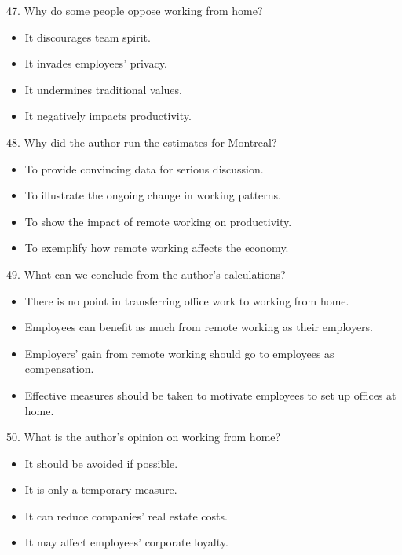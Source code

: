 \documentclass[UTF8,11pt]{ctexart}
\begin{document}
47. Why do some people oppose working from home?


\begin{itemize}[leftmargin=2em,itemsep=.2em,topsep=.4em]\item[A.] It discourages team spirit.
\item[B.] It invades employees' privacy.
\item[C.] It undermines traditional values.
\item[D.] It negatively impacts productivity.
\end{itemize}

48. Why did the author run the estimates for Montreal?


\begin{itemize}[leftmargin=2em,itemsep=.2em,topsep=.4em]\item[A.] To provide convincing data for serious discussion.
\item[B.] To illustrate the ongoing change in working patterns.
\item[C.] To show the impact of remote working on productivity.
\item[D.] To exemplify how remote working affects the economy.
\end{itemize}

49. What can we conclude from the author's calculations?


\begin{itemize}[leftmargin=2em,itemsep=.2em,topsep=.4em]\item[A.] There is no point in transferring office work to working from home.
\item[B.] Employees can benefit as much from remote working as their employers.
\item[C.] Employers' gain from remote working should go to employees as compensation.
\item[D.] Effective measures should be taken to motivate employees to set up offices at home.
\end{itemize}

50. What is the author's opinion on working from home?


\begin{itemize}[leftmargin=2em,itemsep=.2em,topsep=.4em]\item[A.] It should be avoided if possible.
\item[B.] It is only a temporary measure.
\item[C.] It can reduce companies' real estate costs.
\item[D.] It may affect employees' corporate loyalty.
\end{itemize}
\end{document}
